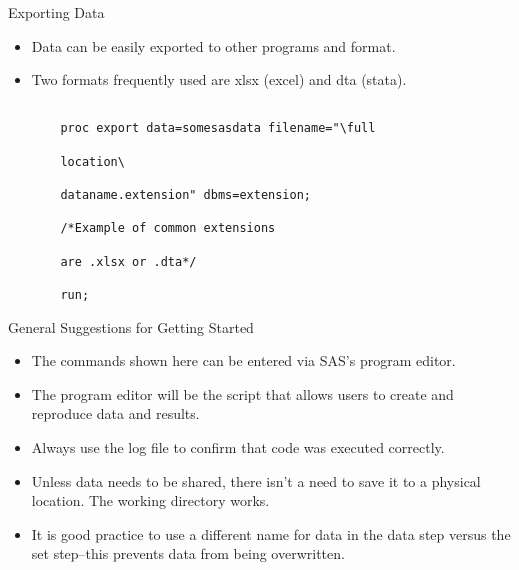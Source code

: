 \documentclass{beamer}
\begin{document}
\begin{frame}[fragile]{Exporting Data}

\begin{itemize}

    \item Data can be easily exported to other programs and format.

    \item Two formats frequently used are xlsx (excel) and dta (stata).

    \begin{verbatim}

    proc export data=somesasdata filename="\full 

    location\

    dataname.extension" dbms=extension;

    /*Example of common extensions 

    are .xlsx or .dta*/

    run;

        \end{verbatim}

    \end{itemize}

    \end{frame}





\begin{frame}{General Suggestions for Getting Started}

\begin{itemize}



    \item The commands shown here can be entered via SAS's program editor.

        \item The program editor will be the script that allows users to create and reproduce data and results.

        \item Always use the log file to confirm that code was executed correctly.

        \item Unless data needs to be shared, there isn't a need to save it to a physical location.  The working directory works.

        \item It is good practice to use a different name for data in the data step versus the set step--this prevents data from being overwritten.



\end{itemize}

\end{frame}
\end{document}
